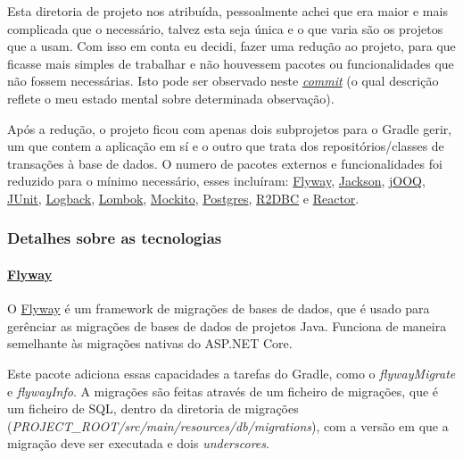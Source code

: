 Esta diretoria de projeto nos atribuída, pessoalmente achei que era maior e mais complicada que o necessário, talvez esta seja única e o que varia são os projetos que a usam. Com isso em conta eu decidi, fazer uma redução ao projeto, para que ficasse mais simples de trabalhar e não houvessem pacotes ou funcionalidades que não fossem necessárias. Isto pode ser observado neste \href{https://github.com/CatKinKitKat/MicronautJooqPostgresREST/commit/3c71d709599662436ae13cf9dcf609a5ca5464e3}{\textit{commit}} (o qual descrição reflete o meu estado mental sobre determinada observação).

Após a redução, o projeto ficou com apenas dois subprojetos para o Gradle gerir, um que contem a aplicação em sí e o outro que trata dos repositórios/classes de transações à base de dados. O numero de pacotes externos e funcionalidades foi reduzido para o mínimo necessário, esses incluíram: \href{https://flywaydb.org/}{Flyway}, \href{http://fasterxml.com/}{Jackson}, \href{https://www.jooq.org/}{jOOQ}, \href{https://junit.org/junit5/}{JUnit}, \href{https://logback.qos.ch/}{Logback}, \href{https://projectlombok.org/}{Lombok}, \href{https://site.mockito.org/}{Mockito}, \href{https://jdbc.postgresql.org/}{Postgres}, \href{https://r2dbc.io/}{R2DBC} e \href{https://projectreactor.io/}{Reactor}.

\newpage

\subsubsection{Detalhes sobre as tecnologias}

\paragraph{\href{https://flywaydb.org/}{Flyway}\\}

O \href{https://flywaydb.org/}{Flyway} é um framework de migrações de bases de dados, que é usado para gerênciar as migrações de bases de dados de projetos Java. Funciona de maneira semelhante às migrações nativas do ASP.NET Core.

Este pacote adiciona essas capacidades a tarefas do Gradle, como o \textit{flywayMigrate} e \textit{flywayInfo}. A migrações são feitas através de um ficheiro de migrações, que é um ficheiro de SQL, dentro da diretoria de migrações (\textit{PROJECT\_ROOT/src/main/resources/db/migrations}), com a versão em que a migração deve ser executada e dois \textit{underscores}.

